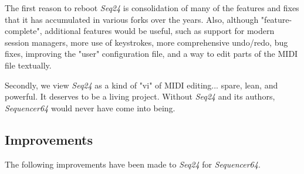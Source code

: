 \documentclass[
 11pt,
 twoside,
 a4paper,
 headinclude,
 footinclude,
 final                                 %
]{article}
\begin{document}
   The first reason to reboot \textsl{Seq24} is consolidation of many of the
   features and fixes that it has accumulated in various forks over the years.
   Also, although "feature-complete", additional features would be useful, such
   as support for modern session managers, more use of keystrokes,
   more comprehensive undo/redo,
   bug fixes, improving the "user" configuration file,
   and a way to edit parts of the MIDI file textually.

   Secondly, we view \textsl{Seq24} as a kind of "vi" of MIDI editing... spare,
   lean, and powerful.  It deserves to be a living project.  Without
   \textsl{Seq24} and its authors, \textsl{Sequencer64} would never have come
   into being.

\subsection{Improvements}
\label{subsec:improvements}

   The following improvements have been made to \textsl{Seq24} for
   \textsl{Sequencer64}.
\end{document}
